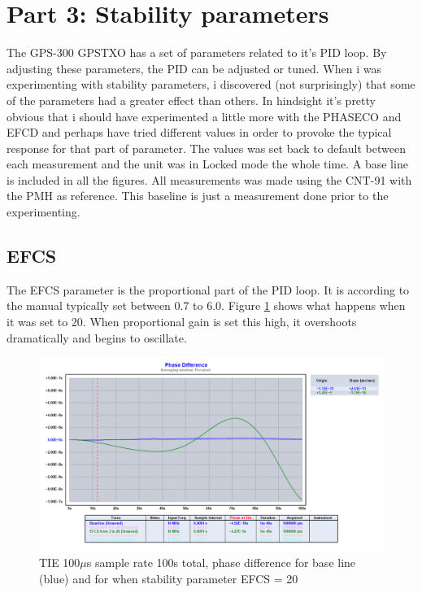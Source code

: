 \documentclass[11pt,english,a4paper]{article}
\begin{document}
\section{Part 3: Stability parameters}
The GPS-300 GPSTXO has a set of parameters related to it's PID loop. By adjusting these parameters, the PID can be adjusted or tuned. When i was experimenting with stability parameters, i discovered (not surprisingly) that some of the parameters had a greater effect than others. In hindsight it's pretty obvious that i should have experimented a little more with the PHASECO and EFCD and perhaps have tried different values in order to provoke the typical response for that part of parameter. The values was set back to default between each measurement and the unit was in Locked mode the whole time. A base line is included in all the figures. All measurements was made using the CNT-91 with the PMH as reference. This baseline is just a measurement done prior to the experimenting.

\subsection{EFCS}
The EFCS parameter is the proportional part of the PID loop. It is according to the manual typically set between 0.7 to 6.0. Figure \ref{fig:EFCS} shows what happens when it was set to 20. When proportional gain is set this high, it overshoots dramatically and begins to oscillate.

\begin{figure}[!htb]
  \centering
    \includegraphics[width=1\textwidth]{EFCS.png}
      \caption{TIE 100$\mu$s sample rate 100s total, phase difference for base line (blue) and for when stability parameter EFCS = 20}
          \label{fig:EFCS}
\end{figure}
\end{document}
